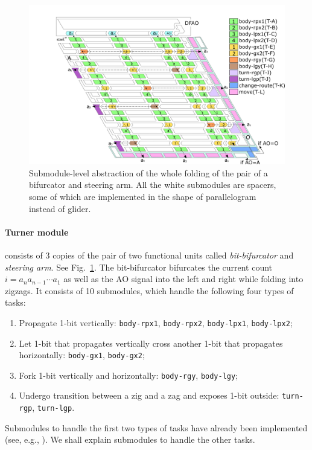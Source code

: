 \documentclass[runningheads]{llncs}
\begin{document}
\begin{figure}[tb]
\centering
\includegraphics[width=\linewidth]{Figs/bitmap.png}
\caption{Submodule-level abstraction of the whole folding of the pair of a bifurcator and steering arm. 
All the white submodules are spacers, some of which are implemented in the shape of parallelogram instead of glider.}
\label{fig:turner}
\end{figure}

\paragraph{Turner module} consists of 3 copies of the pair of two functional units called \textit{bit-bifurcator} and \textit{steering arm}. 
See Fig.~\ref{fig:turner}. 
The bit-bifurcator bifurcates the current count $i = a_n a_{n-1} \cdots a_1$ as well as the AO signal into the left and right while folding into zigzags. 
It consists of 10 submodules, which handle the following four types of tasks: 
\begin{enumerate}[itemsep=0in]
\item Propagate 1-bit vertically: {\tt body-rpx1}, {\tt body-rpx2}, {\tt body-lpx1}, {\tt body-lpx2}; 
\item Let 1-bit that propagates vertically cross another 1-bit that propagates horizontally: {\tt body-gx1}, {\tt body-gx2}; 
\item Fork 1-bit vertically and horizontally: {\tt body-rgy}, {\tt body-lgy}; 
\item Undergo transition between a zig and a zag and exposes 1-bit outside: {\tt turn-rgp}, {\tt turn-lgp}. 
\end{enumerate}
Submodules to handle the first two types of tasks have already been implemented (see, e.g., \cite{HaKiOtSe2016}). 
We shall explain submodules to handle the other tasks. 
\end{document}
